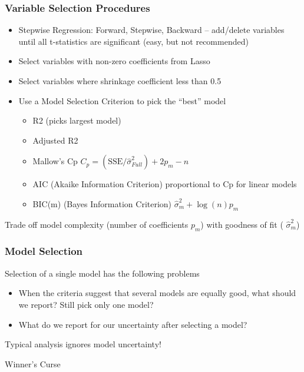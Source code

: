 \documentclass[handout]{beamer}
\begin{document}
\begin{frame}\frametitle{Variable Selection Procedures}
  \begin{itemize}
  \item Stepwise Regression:  Forward, Stepwise, Backward --
    add/delete variables until all t-statistics are significant (easy,
    but not recommended) \pause 
  \item Select variables with non-zero coefficients  from Lasso \pause 
  \item Select variables where shrinkage coefficient less than 0.5 \pause 
  \item Use a Model Selection Criterion to pick the ``best'' model  \pause 
    \begin{itemize}
    \item  R2 (picks largest model)  \pause 
      \item Adjusted R2  \pause 
      \item Mallow's Cp $C_p = (\text{SSE}/\hat{\sigma}_{Full}^2) + 2
        p_m - n $ \pause 
      \item AIC  (Akaike Information Criterion) proportional to Cp for
        linear models \pause 
      \item BIC(m)  (Bayes Information Criterion) $\hat{\sigma}_m^2 +
        \log(n) p_m$  \pause 
    \end{itemize}

  \end{itemize}
Trade off model complexity (number of coefficients $p_m$) with goodness of fit ( $\hat{\sigma}^2_m$)
\end{frame}

\begin{frame}\frametitle{Model Selection}
  Selection of a single model has the following problems \pause 
  \begin{itemize}
  \item When the criteria suggest that several models are equally
    good, what should we report?  Still pick only one model? \pause 
\item What do we report for our uncertainty after selecting a model?  \pause 
  \end{itemize}
Typical analysis ignores model uncertainty! \pause 
\vfill

Winner's Curse
\end{frame}
\end{document}

